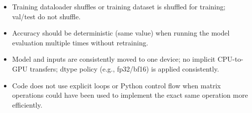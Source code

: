 \documentclass[11pt]{article}
\begin{document}
{\begin{itemize}
  \item Training dataloader shuffles or training dataset is shuffled for training; val/test do not shuffle.
  \item Accuracy should be deterministic (same value) when running the model evaluation multiple times without retraining.
  \item Model and inputs are consistently moved to one device; no implicit CPU-to-GPU transfers; dtype policy (e.g., fp32/bf16) is applied consistently.
  \item Code does not use explicit loops or Python control flow when matrix operations could have been used to implement the exact same operation more efficiently.
\end{itemize}}
\end{document}

